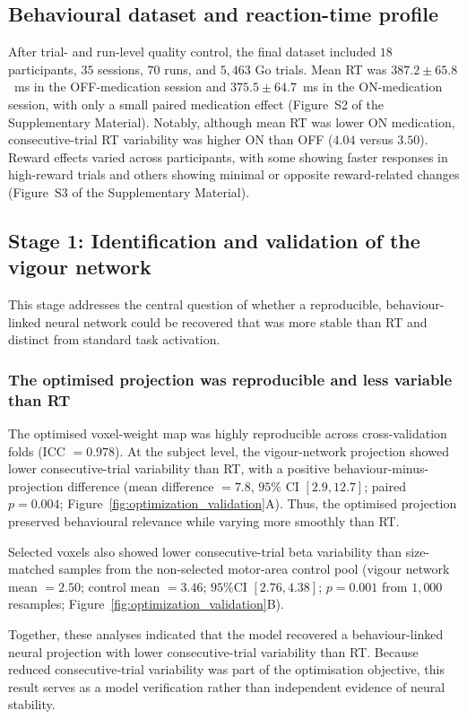 \documentclass[utf8]{FrontiersinHarvard}
\begin{document}
\subsection{Behavioural dataset and reaction-time profile}
After trial- and run-level quality control, the final dataset included \(18\) participants, \(35\) sessions, \(70\) runs, and \(5{,}463\) Go trials. Mean RT was \(387.2 \pm 65.8\)~ms in the OFF-medication session and \(375.5 \pm 64.7\)~ms in the ON-medication session, with only a small paired medication effect (Figure~S2 of the Supplementary Material). Notably, although mean RT was lower ON medication, consecutive-trial RT variability was higher ON than OFF ($4.04$ versus $3.50$). Reward effects varied across participants, with some showing faster responses in high-reward trials and others showing minimal or opposite reward-related changes (Figure~S3 of the Supplementary Material).

\subsection{Stage 1: Identification and validation of the vigour network}
This stage addresses the central question of whether a reproducible, behaviour-linked neural network could be recovered that was more stable than RT and distinct from standard task activation.

\subsubsection{The optimised projection was reproducible and less variable than RT}
The optimised voxel-weight map was highly reproducible across cross-validation folds (ICC \(=0.978\)). At the subject level, the vigour-network projection showed lower consecutive-trial variability than RT, with a positive behaviour-minus-projection difference (mean difference \(= 7.8\), \(95\%\) CI \([2.9, 12.7]\); paired \(p = 0.004\); Figure~\ref{fig:optimization_validation}A). Thus, the optimised projection preserved behavioural relevance while varying more smoothly than RT.

Selected voxels also showed lower consecutive-trial beta variability than size-matched samples from the non-selected motor-area control pool (vigour network mean \(=2.50\); control mean \(=3.46\); \(95\%\)CI \([2.76,4.38]\); \(p = 0.001\) from \(1{,}000\) resamples; Figure~\ref{fig:optimization_validation}B).

Together, these analyses indicated that the model recovered a behaviour-linked neural projection with lower consecutive-trial variability than RT. Because reduced consecutive‑trial variability was part of the optimisation objective, this result serves as a model verification rather than independent evidence of neural stability.
\end{document}
